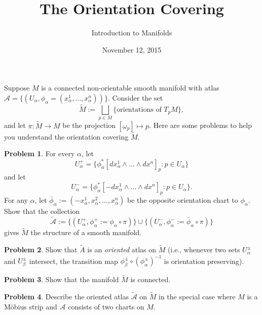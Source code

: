 \documentclass{amsart}
\newcommand{\+}[1]{\ensuremath{\mathbf{#1}}}
\renewcommand{\tilde}{\widetilde}
\theoremstyle{definition}
\newtheorem{prob}{Problem}
\begin{document}
\title{The Orientation Covering}
\date{November 12, 2015}
\author{Introduction to Manifolds}

\maketitle


Suppose $M$ is a connected non-orientable smooth manifold with
atlas $\mathcal{A} = \{(U_\alpha, \phi_\alpha=(x_\alpha^1,\ldots,x_\alpha^n))\}$.
Consider the set
\[
\tilde{M} := \bigsqcup_{p \in M} \{\text{orientations of } T_pM\},
\]
and let $\pi:\tilde{M} \to M$ be the projection $[\omega_p] \mapsto p$.  
Here are some problems to help you understand the orientation covering $\tilde{M}$.

\begin{prob}
For every $\alpha$, let 
\[U^+_\alpha = \{\phi_\alpha^*[dx^1_\alpha \wedge \ldots \wedge dx^n]_p : p \in U_\alpha\}\]
and let 
\[U^-_\alpha = \{\phi_\alpha^*[-dx^1_\alpha \wedge \ldots \wedge dx^n]_p : p \in U_\alpha\}.\]
For any $\alpha$, let $\bar{\phi}_\alpha := (-x_\alpha^1,x_\alpha^2,\ldots,x^n_\alpha)$ be
the opposite orientation chart to $\phi_\alpha$.
Show that the collection 
\[\tilde{\mathcal{A}} 
:= \{(U^+_\alpha,\phi_\alpha^+ := \phi_\alpha \circ \pi)\} \cup \{(U_\alpha^-, \phi^-_\alpha := \bar{\phi}_\alpha \circ \pi)\}\]
gives $\tilde{M}$ the structure of a smooth manifold.
\end{prob}

\begin{prob}
 Show that $\tilde{A}$ is an \emph{oriented} atlas on $\tilde{M}$ (i.e.,
 whenever two sets $U^{\pm}_\alpha$ and $U^{\pm}_\beta$ intersect,
 the transition map $\phi^{\pm}_\beta \circ (\phi^{\pm}_\alpha)^{-1}$ is orientation preserving).
\end{prob}

\begin{prob}
 Show that the manifold $\tilde{M}$ is connected.
\end{prob}

\begin{prob}
Describe the oriented atlas $\tilde{\mathcal{A}}$ on $\tilde{M}$ in the special case where $M$ is a M\"obius strip and $\mathcal{A}$ consists of two charts on $M$.
\end{prob}
\end{document}
